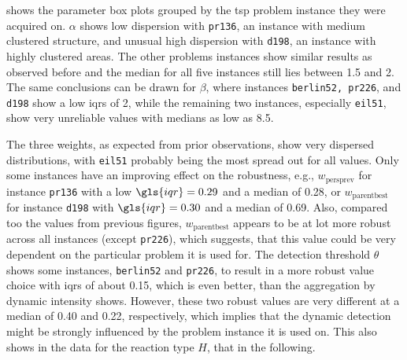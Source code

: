  shows the parameter box plots grouped by the \gls{tsp} problem instance they were acquired on. $\alpha$ shows low dispersion with \texttt{pr136}, an instance with medium clustered structure, and unusual high dispersion with \texttt{d198}, an instance with highly clustered areas. The other problems instances show similar results as observed before and the median for all five instances still lies between 1.5 and 2. The same conclusions can be drawn for $\beta$, where instances \texttt{berlin52, pr226}, and \texttt{d198} show a low \glspl{iqr} of 2, while the remaining two instances, especially \texttt{eil51}, show very unreliable values with medians as low as 8.5. 

The three weights, as expected from prior observations, show very dispersed distributions, with \texttt{eil51} probably being the most spread out for all values. Only some instances have an improving effect on the robustness, e.g., $w_{\text{persprev}}$ for instance \texttt{pr136} with a low $\gls{iqr} =  0.29$ and a median of 0.28, or $w_{\text{parentbest}}$ for instance \texttt{d198} with $\gls{iqr} =  0.30$ and a median of 0.69. Also, compared too the values from previous figures, $w_{\text{parentbest}}$ appears to be at lot more robust across all instances (except \texttt{pr226}), which suggests, that this value could be very dependent on the particular problem it is used for.
The detection threshold $\theta$ shows some instances, \texttt{berlin52} and \texttt{pr226}, to result in a more robust value choice with \glspl{iqr} of about 0.15, which is even better, than the aggregation by dynamic intensity shows. However, these two robust values are very different at a median of 0.40 and 0.22, respectively, which implies that the dynamic detection might be strongly influenced by the problem instance it is used on. This also shows in the data for the reaction type $H$, that in the following.
 
